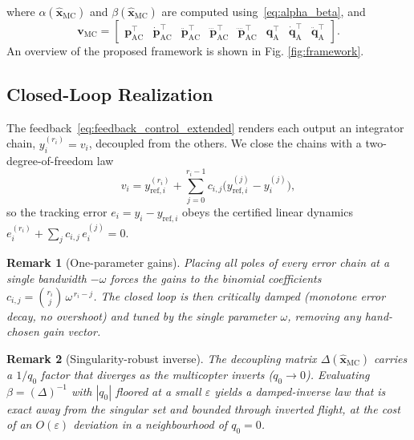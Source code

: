 \documentclass[letterpaper, 10 pt, conference]{ieeeconf}  %
\newtheorem{remark}{Remark}
\begin{document}
where $\alpha(\hat{\mathbf{x}}_\text{MC})$ and $\beta(\hat{\mathbf{x}}_\text{MC})$ are computed using~\eqref{eq:alpha_beta}, and
\begin{equation}
\mathbf{v}_\text{MC} = \begin{bmatrix} \mathbf{p}_\text{AC}^\top & \dot{\mathbf{p}}_\text{AC}^\top & \ddot{\mathbf{p}}_\text{AC}^\top & \dddot{\mathbf{p}}_\text{AC}^\top & \ddddot{\mathbf{p}}_\text{AC}^\top & \mathbf{q}_\text{A}^\top & \dot{\mathbf{q}}_\text{A}^\top & \ddot{\mathbf{q}}_\text{A}^\top \end{bmatrix}.
\end{equation}
An overview of the proposed framework is shown in Fig. \ref{fig:framework}.

\subsection{Closed-Loop Realization}
\label{ssec:closedloop}
The feedback~\eqref{eq:feedback_control_extended} renders each output an integrator chain, $y_i^{(r_i)} = v_i$, decoupled from the others. We close the chains with a two-degree-of-freedom law
\begin{equation}
\label{eq:tracking_law}
v_i = y_{\text{ref},i}^{(r_i)} + \sum_{j=0}^{r_i-1} c_{i,j}\big(y_{\text{ref},i}^{(j)} - y_i^{(j)}\big),
\end{equation}
so the tracking error $e_i = y_i - y_{\text{ref},i}$ obeys the certified linear dynamics $e_i^{(r_i)} + \sum_{j} c_{i,j}\, e_i^{(j)} = 0$.

\begin{remark}[One-parameter gains]
Placing all poles of every error chain at a single bandwidth $-\omega$ forces the gains to the binomial coefficients $c_{i,j} = \binom{r_i}{j}\,\omega^{\,r_i-j}$. The closed loop is then critically damped (monotone error decay, no overshoot) and tuned by the single parameter $\omega$, removing any hand-chosen gain vector.
\end{remark}

\begin{remark}[Singularity-robust inverse]
The decoupling matrix $\Delta(\hat{\mathbf{x}}_\text{MC})$ carries a $1/q_0$ factor that diverges as the multicopter inverts ($q_0 \to 0$). Evaluating $\beta = (\Delta)^{-1}$ with $|q_0|$ floored at a small $\varepsilon$ yields a damped-inverse law that is exact away from the singular set and bounded through inverted flight, at the cost of an $O(\varepsilon)$ deviation in a neighbourhood of $q_0 = 0$.
\end{remark}
\end{document}
